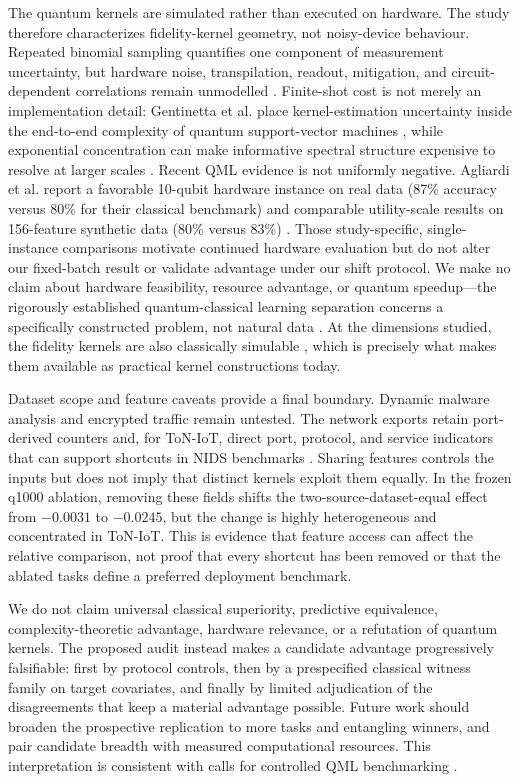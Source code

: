 \documentclass[referee,lineno,pdflatex,sn-nature]{sn-jnl}
\theoremstyle{thmstyleone}%
\theoremstyle{thmstyletwo}%
\theoremstyle{thmstylethree}%
\begin{document}
The quantum kernels are simulated rather than executed on hardware. The study therefore characterizes fidelity-kernel geometry, not noisy-device behaviour. Repeated binomial sampling quantifies one component of measurement uncertainty, but hardware noise, transpilation, readout, mitigation, and circuit-dependent correlations remain unmodelled \cite{wang2021nisq}. Finite-shot cost is not merely an implementation detail: Gentinetta et al. place kernel-estimation uncertainty inside the end-to-end complexity of quantum support-vector machines \cite{gentinetta2024complexity}, while exponential concentration can make informative spectral structure expensive to resolve at larger scales \cite{thanasilp2024concentration}. Recent QML evidence is not uniformly negative. Agliardi et al. report a favorable 10-qubit hardware instance on real data (87\% accuracy versus 80\% for their classical benchmark) and comparable utility-scale results on 156-feature synthetic data (80\% versus 83\%) \cite{agliardi2026covariant}. Those study-specific, single-instance comparisons motivate continued hardware evaluation but do not alter our fixed-batch result or validate advantage under our shift protocol. We make no claim about hardware feasibility, resource advantage, or quantum speedup---the rigorously established quantum-classical learning separation concerns a specifically constructed problem, not natural data \cite{liu2021rigorous}. At the dimensions studied, the fidelity kernels are also classically simulable \cite{schreiber2023surrogates,jerbi2024shadows}, which is precisely what makes them available as practical kernel constructions today.

Dataset scope and feature caveats provide a final boundary. Dynamic malware analysis and encrypted traffic remain untested. The network exports retain port-derived counters and, for ToN-IoT, direct port, protocol, and service indicators that can support shortcuts in NIDS benchmarks \cite{engelen2021troubleshooting}. Sharing features controls the inputs but does not imply that distinct kernels exploit them equally. In the frozen q1000 ablation, removing these fields shifts the two-source-dataset-equal effect from $-0.0031$ to $-0.0245$, but the change is highly heterogeneous and concentrated in ToN-IoT. This is evidence that feature access can affect the relative comparison, not proof that every shortcut has been removed or that the ablated tasks define a preferred deployment benchmark.

We do not claim universal classical superiority, predictive equivalence, complexity-theoretic advantage, hardware relevance, or a refutation of quantum kernels. The proposed audit instead makes a candidate advantage progressively falsifiable: first by protocol controls, then by a prespecified classical witness family on target covariates, and finally by limited adjudication of the disagreements that keep a material advantage possible. Future work should broaden the prospective replication to more tasks and entangling winners, and pair candidate breadth with measured computational resources. This interpretation is consistent with calls for controlled QML benchmarking \cite{bowles2024betterthanclassical,schnabel2025scrutiny,kakavand2026benchmarking}.
\end{document}
